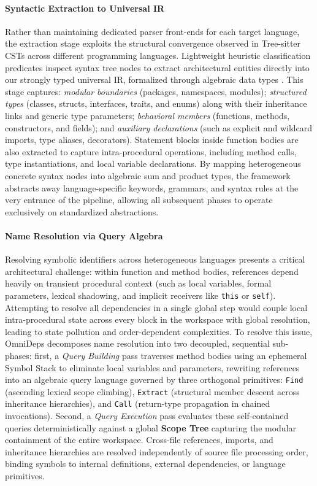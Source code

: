 \documentclass[a4paper, 11pt]{article}
\begin{document}
\paragraph{Syntactic Extraction to Universal IR}
Rather than maintaining dedicated parser front-ends for each target
language, the extraction stage exploits the structural convergence
observed in Tree-sitter CSTs across different programming languages.
Lightweight heuristic classification predicates inspect syntax tree
nodes to extract architectural entities directly into our strongly typed
universal IR, formalized through algebraic data types \cite{pierce_types_2002}.
This stage captures:
\textit{modular boundaries} (packages, namespaces, modules);
\textit{structured types} (classes, structs, interfaces, traits, and
enums) along with their inheritance links and generic type parameters;
\textit{behavioral members} (functions, methods, constructors, and
fields); and \textit{auxiliary declarations} (such as explicit and wildcard
imports, type aliases, decorators).
Statement blocks inside function bodies are also extracted to
capture intra-procedural operations, including method calls, type
instantiations, and local variable declarations.
By mapping heterogeneous concrete syntax nodes into algebraic sum and
product types, the framework abstracts away language-specific keywords,
grammars, and syntax rules at the very entrance of the pipeline,
allowing all subsequent phases to operate exclusively on standardized
abstractions.

\paragraph{Name Resolution via Query Algebra}
Resolving symbolic identifiers across heterogeneous languages presents a
critical architectural challenge: within function and method bodies,
references depend heavily on transient procedural context (such as
  local variables, formal parameters, lexical shadowing, and implicit
receivers like \texttt{this} or \texttt{self}).
Attempting to resolve all dependencies in a single global step would
couple local intra-procedural state across every block in the workspace
with global resolution, leading to state pollution and
order-dependent complexities.
To resolve this issue, OmniDeps decomposes name resolution into two
decoupled, sequential sub-phases:
first, a \textit{Query Building} pass traverses method bodies using an
ephemeral Symbol Stack to eliminate local variables and parameters,
rewriting references into an algebraic query language governed by three
orthogonal primitives: \texttt{Find} (ascending lexical scope climbing),
\texttt{Extract} (structural member descent across inheritance
hierarchies), and \texttt{Call} (return-type propagation in chained
invocations).
Second, a \textit{Query Execution} pass evaluates these self-contained
queries deterministically against a global \textbf{Scope Tree} capturing
the modular containment of the entire workspace.
Cross-file references, imports, and inheritance hierarchies are resolved
independently of source file processing order, binding symbols to
internal definitions, external dependencies, or language primitives.
\end{document}
